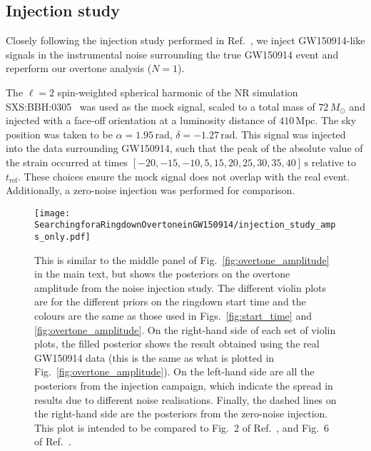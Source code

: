 \subsection{Injection study}\label{app:inj}

Closely following the injection study performed in Ref.~\cite{Cotesta:2022pci}, we inject GW150914-like signals in the instrumental noise surrounding the true GW150914 event and reperform our overtone analysis ($N=1$).

The $\ell=2$ spin-weighted spherical harmonic of the NR simulation SXS:BBH:0305~\cite{Lovelace:2016uwp} was used as the mock signal, scaled to a total mass of $72\,M_\odot$ and injected with a face-off orientation at a luminosity distance of $410\,\mathrm{Mpc}$. 
The sky position was taken to be $\alpha = 1.95\,\mathrm{rad}$, $\delta=-1.27\,\mathrm{rad}$.
This signal was injected into the data surrounding GW150914, such that the peak of the absolute value of the strain occurred at times $[-20, -15, -10, 5, 15, 20, 25, 30, 35, 40]\,\mathrm{s}$ relative to $t_\mathrm{ref}$.
These choices ensure the mock signal does not overlap with the real event.
Additionally, a zero-noise injection was performed for comparison. 

\begin{figure}[t]
    \centering
    \texttt{[image: SearchingforaRingdownOvertoneinGW150914/injection\_study\_amps\_only.pdf]}
    \caption[Posteriors on the overtone amplitude from a noise injection study]{ 
    This is similar to the middle panel of Fig.~\ref{fig:overtone_amplitude} in the main text, but shows the posteriors on the overtone amplitude from the noise injection study.
    The different violin plots are for the different priors on the ringdown start time and the colours are the same as those used in Figs.~\ref{fig:start_time} and \ref{fig:overtone_amplitude}.
    On the right-hand side of each set of violin plots, the filled posterior shows the result obtained using the real GW150914 data (this is the same as what is plotted in Fig.~\ref{fig:overtone_amplitude}). 
    On the left-hand side are all the posteriors from the injection campaign, which indicate the spread in results due to different noise realisations.  
    Finally, the dashed lines on the right-hand side are the posteriors from the zero-noise injection.
    This plot is intended to be compared to Fig.~2 of Ref.~\cite{Cotesta:2022pci}, and Fig.~6 of Ref.~\cite{Isi:2022mhy}.
    }
    \label{fig:injection_study}
\end{figure}

